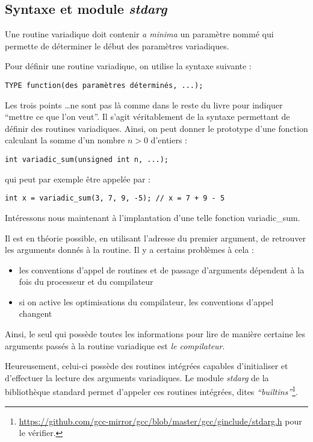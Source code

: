 \documentclass[../../../main.tex]{subfiles}
\begin{document}
\subsection{Syntaxe et module \textit{stdarg}}
Une routine variadique doit contenir \textit{a minima} un paramètre nommé qui permette de déterminer le début des paramètres variadiques.

Pour définir une routine variadique, on utilise la syntaxe suivante :
\begin{verbatim}
TYPE function(des paramètres déterminés, ...);
\end{verbatim}
Les trois points \dots ne sont pas là comme dans le reste du livre pour indiquer ``mettre ce que l'on veut''. Il s'agit véritablement de la syntaxe permettant de définir des routines variadiques. Ainsi, on peut donner le prototype d'une fonction calculant la somme d'un nombre $n > 0$ d'entiers :
\begin{verbatim}
int variadic_sum(unsigned int n, ...);
\end{verbatim}
qui peut par exemple être appelée par :
\begin{verbatim}
int x = variadic_sum(3, 7, 9, -5); // x = 7 + 9 - 5
\end{verbatim}
Intéressons nous maintenant à l'implantation d'une telle fonction \textsf{variadic\_sum}.

Il est en théorie possible, en utilisant l'adresse du premier argument, de retrouver les arguments donnés à la routine. Il y a certains problèmes à cela :
\begin{itemize}
	\item les conventions d'appel de routines et de passage d'arguments dépendent à la fois du processeur et du compilateur
	\item si on active les optimisations du compilateur, les conventions d'appel changent
\end{itemize} 
Ainsi, le seul qui possède toutes les informations pour lire de manière certaine les arguments passés à la routine variadique est \textit{le compilateur}. 

Heureusement, celui-ci possède des routines intégrées capables d'initialiser et d'effectuer la lecture des arguments variadiques. Le module \textit{stdarg} de la bibliothèque standard permet d'appeler ces routines intégrées, dites \textit{``builtins''}\footnote{\url{https://github.com/gcc-mirror/gcc/blob/master/gcc/ginclude/stdarg.h} pour le vérifier.}.
\end{document}
